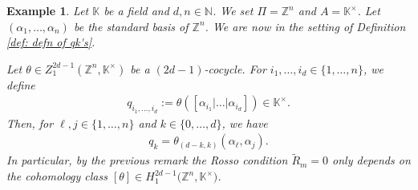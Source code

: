 \documentclass[10pt,a4paper]{amsart}
\numberwithin{equation}{section}
\newtheorem{Example}[Theorem]{Example}
\newcommand{\NN }{\mathbb{N}}
\newcommand{\ZZ }{\mathbb{Z}}
\newcommand{\KK }{\mathbb{K}}
\begin{document}
\begin{Example} \label{ex: Rosso condition depends on Cohclass}
 Let $\KK$ be a field and $d,n \in \NN$. We set $\Pi=\ZZ^n$ and $A=\KK^\times$. Let $(\alpha_1,\dots, \alpha_n)$ be the standard basis of $\ZZ^n$. We are now in the setting of Definition \ref{def: defn of qk's}.

 Let $\theta \in Z^{2d-1}_1(\ZZ^n,\KK^\times)$ be a $(2d-1)$-cocycle. For $i_1, \dots, i_d \in \{1,\dots,n\}$, we define
 \begin{align*}
 q_{i_1,\dots,i_d}:= \theta([\alpha_{i_1}|\dots |\alpha_{i_d}]) \in \KK^\times.
 \end{align*}
 Then, for $\ell,j \in \{1, \dots,n\}$ and $k \in \{0,\dots,d\}$, we have
 \begin{align*}
 q_k = \theta_{(d-k,k)}(\alpha_\ell,\alpha_j).
 \end{align*}
 In particular, by the previous remark the Rosso condition $\tilde{R}_m=0$ only depends on the cohomology class $[\theta] \in H^{2d-1}_1\big(\ZZ^n,\KK^\times\big)$.
\end{Example}

\end{document}

